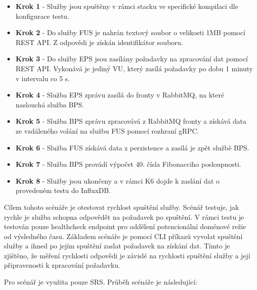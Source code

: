 \begin{itemize}
    \item \textbf{Krok 1} - Služby jsou spuštěny v rámci stacku ve specifické kompilaci dle konfigurace testu.
    \item \textbf{Krok 2} - Do služby FUS je nahrán textový soubor o velikosti 1MB pomocí REST API. Z odpovědi je získán identifikátor souboru.
    \item \textbf{Krok 3} - Do služby EPS jsou zasílány požadavky na zpracování dat pomocí REST API. Vykonává je jediný VU, který zasílá požadavky po dobu 1 minuty v intervalu co 5 s.
    \item \textbf{Krok 4} - Služba EPS zprávu zasílá do fronty v RabbitMQ, na které naslouchá služba BPS. 
    \item \textbf{Krok 5} - Služba BPS zprávu zpracovává z RabbitMQ fronty a získává data ze vzdáleného volání na službu FUS pomocí rozhraní gRPC. 
    \item \textbf{Krok 6} - Služba FUS získává data z perzistence a zasílá je zpět službě BPS. 
    \item \textbf{Krok 7} - Služba BPS provádí výpočet 40. čísla Fibonacciho posloupnosti.
    \item \textbf{Krok 8} - Služby jsou ukončeny a v rámci K6 dojde k zaslání dat o provedeném testu do InfluxDB.
\end{itemize}


Cílem tohoto scénáře je otestovat rychlost spuštění služby. Scénář testuje, jak rychle je služba schopna odpovědět na požadavek po spuštění. V rámci testu je testován pouze healthcheck endpoint pro oddělení potencionální doménové režie od výsledného času. Základem scénáře je pomocí CLI příkazů vyvolat spuštění služby a ihned po jejím spuštění zaslat požadavek na získání dat. Tímto je zjištěno, že měření rychlosti odpovědi je závislé na rychlosti spuštění služby a její připravenosti k zpracování požadavku. 


Pro scénář je využita pouze SRS. Průběh scénáře je následující:

